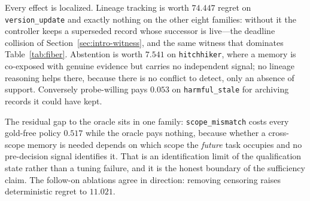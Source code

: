 \documentclass{article}
\begin{document}
Every effect is localized. Lineage tracking is worth $74.447$ regret on
\texttt{version\_update} and exactly nothing on the other eight families: without
it the controller keeps a superseded record whose successor is live---the deadline
collision of Section~\ref{sec:intro-witness}, and the same witness that dominates
Table~\ref{tab:fiber}. Abstention is worth $7.541$ on \texttt{hitchhiker}, where a
memory is co-exposed with genuine evidence but carries no independent signal; no
lineage reasoning helps there, because there is no conflict to detect, only an
absence of support. Conversely probe-willing pays $0.053$ on
\texttt{harmful\_stale} for archiving records it could have kept.

The residual gap to the oracle sits in one family: \texttt{scope\_mismatch} costs
every gold-free policy $0.517$ while the oracle pays nothing, because whether a
cross-scope memory is needed depends on which scope the \emph{future} task
occupies and no pre-decision signal identifies it. That is an identification limit
of the qualification state rather than a tuning failure, and it is the honest
boundary of the sufficiency claim. The follow-on ablations agree in direction:
removing censoring raises deterministic regret to $11.021$.
\end{document}
